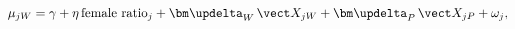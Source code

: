 \begin{equation}\label{equation5}
\mu_{jW}=\gamma+\eta\,\text{female ratio}_j+\bm\updelta_W\,\vect X_{jW}+\bm\updelta_P\,\vect X_{jP}+\omega_j,
\end{equation}